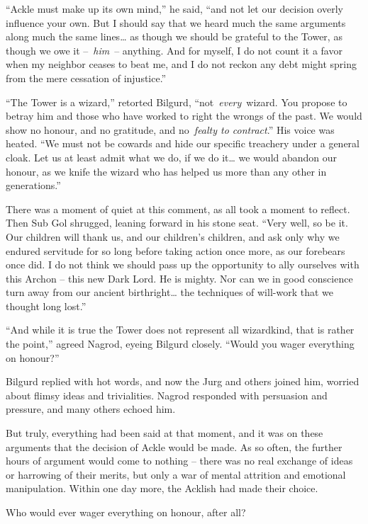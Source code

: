 ``Ackle must make up its own mind,'' he said, ``and not let our decision
overly influence your own. But I should say that we heard much the same
arguments along much the same lines\ldots{} as though we should be
grateful to the Tower, as though we owe it --~\emph{him}~-- anything.
And for myself, I do not count it a favor when my neighbor ceases to
beat me, and I do not reckon any debt might spring from the mere
cessation of injustice.''

``The Tower is a wizard,'' retorted Bilgurd, ``not~\emph{every}~wizard.
You propose to betray him and those who have worked to right the wrongs
of the past. We would show no honour, and no gratitude, and
no~\emph{fealty to contract}.'' His voice was heated. ``We must not be
cowards and hide our specific treachery under a general cloak. Let us at
least admit what we do, if we do it\ldots{} we would abandon our honour,
as we knife the wizard who has helped us more than any other in
generations.''

There was a moment of quiet at this comment, as all took a moment to
reflect. Then Sub Gol shrugged, leaning forward in his stone seat.
``Very well, so be it. Our children will thank us, and our children's
children, and ask only why we endured servitude for so long before
taking action once more, as our forebears once did. I do not think we
should pass up the opportunity to ally ourselves with this Archon --
this new Dark Lord. He is mighty. Nor can we in good conscience turn
away from our ancient birthright\ldots{} the techniques of will-work
that we thought long lost.''

``And while it is true the Tower does not represent all wizardkind, that
is rather the point,'' agreed Nagrod, eyeing Bilgurd closely. ``Would
you wager everything on honour?''

Bilgurd replied with hot words, and now the Jurg and others joined him,
worried about flimsy ideas and trivialities. Nagrod responded with
persuasion and pressure, and many others echoed him.

But truly, everything had been said at that moment, and it was on these
arguments that the decision of Ackle would be made. As so often, the
further hours of argument would come to nothing -- there was no real
exchange of ideas or harrowing of their merits, but only a war of mental
attrition and emotional manipulation. Within one day more, the Acklish
had made their choice.

Who would ever wager everything on honour, after all?

